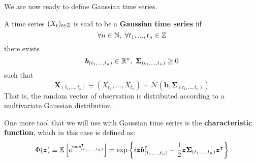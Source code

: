 We are now ready to define Gaussian time series.
\begin{definition}
    A time series $(X_t)_{t\in\mathbb{Z}}$ is said to be a \textbf{Gaussian time series} iif 
    \[
        \forall n\in\mathbb{N}, \text{ }\forall t_1, ..., t_n\in\mathbb{Z}
    \]
    there exists
    \[
        \boldsymbol{b}_{(t_1, ...,t_n)}\in\mathbb{R}^n, \text{ }\boldsymbol{\Sigma}_{(t_1, ...,t_n)}\ge0   
    \]
    such that
    \[
        \boldsymbol{X}_{(t_1, ...,t_n)}\equiv(X_{t_1}, ..., X_{t_n})\sim\mathcal{N}(\boldsymbol{b}, \boldsymbol{\Sigma}_{(t_1, ...,t_n)})
    \]
    That is, the random vector of observation is distributed according to a multivariate Gaussian distribution.
\end{definition}

One more tool that we will use with Gaussian time series is the \textbf{characteristic function}, which in this case is defined as:
\[
    \Phi(\boldsymbol{z}) \equiv \mathbb{E}\left[e^{i\boldsymbol{z}\boldsymbol{x}^\intercal_{(t_1, ...,t_n)}}\right] = \exp{\left\{i\boldsymbol{z}\boldsymbol{b}^\intercal_{(t_1, ...,t_n)}-\frac{1}{2}\boldsymbol{z}\boldsymbol{\Sigma}_{(t_1, ...,t_n)}\boldsymbol{z}^\intercal\right\}}
\]

